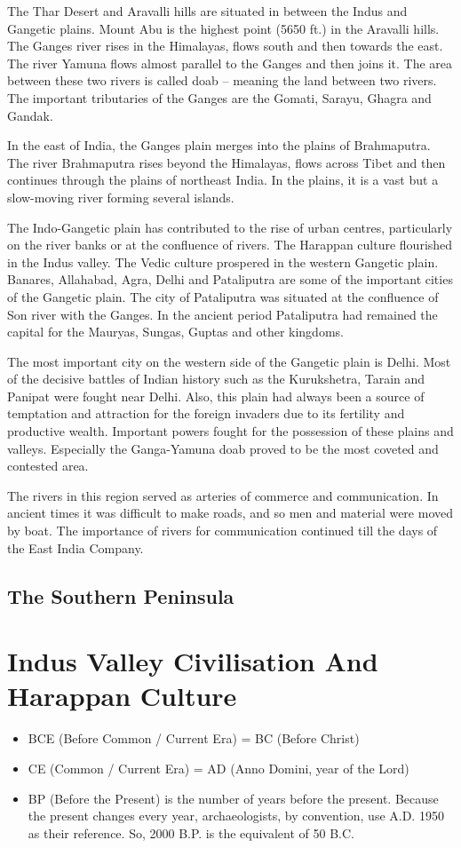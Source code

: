 \documentclass[8pt, a4paper, oneside, twocolumn]{extarticle}
\begin{document}
The Thar Desert and Aravalli hills are situated in between the Indus and Gangetic plains. Mount Abu is the highest point (5650 ft.) in the Aravalli hills. The Ganges river rises in the Himalayas, flows south and then towards the east. The river Yamuna flows almost parallel to the Ganges and then joins it. The area between these two rivers is called doab – meaning the land between two rivers. The important tributaries of the Ganges are the Gomati, Sarayu, Ghagra and Gandak.

In the east of India, the Ganges plain merges into the plains of Brahmaputra. The river Brahmaputra rises beyond the Himalayas, flows across Tibet and then continues through the plains of northeast India. In the plains, it is a vast but a slow-moving river forming several islands.

The Indo-Gangetic plain has contributed to the rise of urban centres, particularly on the river banks or at the confluence of rivers. The Harappan culture flourished in the Indus valley. The Vedic culture prospered in the western Gangetic plain. Banares, Allahabad, Agra, Delhi and Pataliputra are some of the important cities of the Gangetic plain. The city of Pataliputra was situated at the confluence of Son river with the Ganges. In the ancient period Pataliputra had remained the capital for the Mauryas, Sungas, Guptas and other kingdoms.

The most important city on the western side of the Gangetic plain is Delhi. Most of the decisive battles of Indian history such as the Kurukshetra, Tarain and Panipat were fought near Delhi. Also, this plain had always been a source of temptation and attraction for the foreign invaders due to its fertility and productive wealth. Important powers fought for the possession of these plains and valleys. Especially the Ganga-Yamuna doab proved to be the most coveted and contested area.

The rivers in this region served as arteries of commerce and communication. In ancient times it was difficult to make roads, and so men and material were moved by boat. The importance of rivers for communication continued till the days of the East India Company.

\subsection{The Southern Peninsula}


\section{Indus Valley Civilisation And Harappan Culture}
\begin{itemize}
  \item BCE (Before Common / Current Era) = BC (Before Christ)
  \item CE (Common / Current Era) = AD (Anno Domini, year of the Lord)
  \item BP (Before the Present) is the number of years before the present. Because the present changes every year, archaeologists, by convention, use A.D. 1950 as their reference. So, 2000 B.P. is the equivalent of 50 B.C.
\end{itemize}
\end{document}
